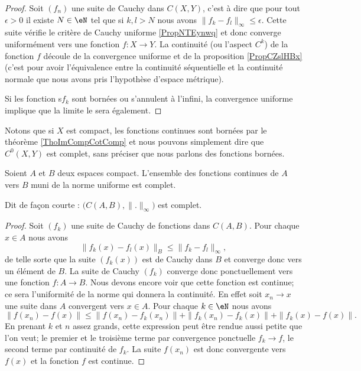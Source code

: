 \begin{proof}
    Soit \( (f_n)\) une suite de Cauchy dans \( C(X,Y)\), c'est à dire que pour tout \( \epsilon>0\) il existe \( N\in \eN\) tel que si \( k,l>N\) nous avons \( \| f_k-f_l \|_{\infty}\leq \epsilon\). Cette suite vérifie le critère de Cauchy uniforme \ref{PropNTEynwq} et donc converge uniformément vers une fonction \( f\colon X\to Y\). La continuité (ou l'aspect \( C^k\)) de la fonction \( f\) découle de la convergence uniforme et de la proposition \ref{PropCZslHBx} (c'est pour avoir l'équivalence entre la continuité séquentielle et la continuité normale que nous avons pris l'hypothèse d'espace métrique).

    Si les fonction s\( f_k\) sont bornées ou s'annulent à l'infini, la convergence uniforme implique que la limite le sera également.
\end{proof}
    Notons que si \( X\) est compact, les fonctions continues sont bornées par le théorème \ref{ThoImCompCotComp} et nous pouvons simplement dire que \( C^0(X,Y)\) est complet, sans préciser que nous parlons des fonctions bornées.


\begin{lemma}       \label{LemdLKKnd}
    Soient \( A\) et \( B\) deux espaces compact. L'ensemble des fonctions continues de \( A\) vers \( B\) muni de la norme uniforme est complet.

    Dit de façon courte : \( \big( C(A,B),\| . \|_{\infty} \big)\) est complet.
\end{lemma}

\begin{proof}
    Soit \( (f_k)\) une suite de Cauchy de fonctions dans \( C(A,B)\). Pour chaque \( x\in A \) nous avons
    \begin{equation}
        \| f_k(x)-f_l(x) \|_B\leq \| f_k-f_l \|_{\infty},
    \end{equation}
    de telle sorte que la suite \( (f_k(x))\) est de Cauchy dans \( B\) et converge donc vers un élément de \( B\). La suite de Cauchy \( (f_k)\) converge donc ponctuellement vers une fonction \( f\colon A\to B\). Nous devons encore voir que cette fonction est continue; ce sera l'uniformité de la norme qui donnera la continuité. En effet soit \( x_n\to x\) une suite dans \( A\) convergent vers \( x\in A\). Pour chaque \( k\in \eN\) nous avons
    \begin{equation}
        \| f(x_n)-f(x) \|\leq \| f(x_n)-f_k(x_n) \|  +\| f_k(x_n)-f_k(x) \|+\| f_k(x)-f(x) \|.
    \end{equation}
    En prenant \( k\) et \( n\) assez grands, cette expression peut être rendue aussi petite que l'on veut; le premier et le troisième terme par convergence ponctuelle \( f_k\to f\), le second terme par continuité de \( f_k\). La suite \( f(x_n)\) est donc convergente vers \( f(x)\) et la fonction \( f\) est continue.
\end{proof}

